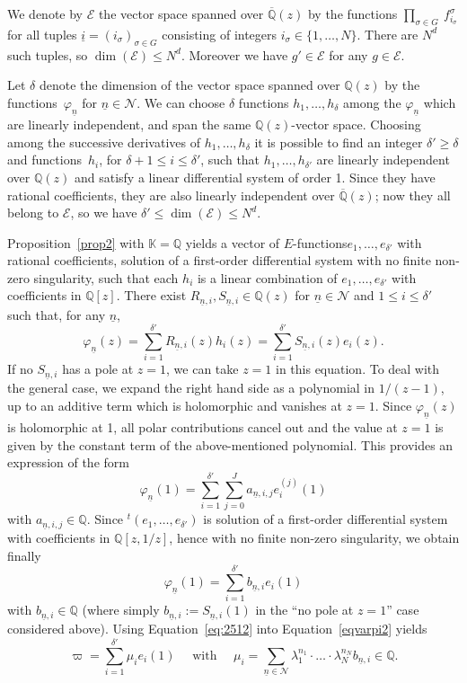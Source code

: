 \documentclass[11pt]{article}
\numberwithin{equation}{section}
\newcommand{\Efunctions}{$E$\nobreakdash-func\-tions\xspace}
\theoremstyle{definition}
\newcommand{\Q}{\mathbb{Q}}
\newcommand{\Qbar}{\overline{\mathbb Q}}
\newcommand{\calE}{\mathcal E}
\newcommand{\calN}{\mathcal N}
\newcommand{\isoul}{{\underline{i}}}
\newcommand{\nsoul}{\underline{n}}
\begin{document}
We denote by $\calE$ the vector space spanned over $\Qbar(z)$ by the functions
$\prod_{\sigma\in G} \ f_{i_{ \sigma}}^{ \sigma} $ for all tuples $\isoul = (i_\sigma)_{\sigma\in G}$ consisting of integers $i_\sigma\in\{1,\ldots,N\}$. There are $N^d$ such tuples, so $\dim(\calE)\leq N^d$. Moreover we have $g'\in\calE $ for any $g\in\calE$.

Let $\delta$ denote the dimension of the vector space spanned over $\Q(z)$ by the functions~$\varphi_{\nsoul}$ for $\nsoul\in\calN$. We can choose $\delta$ functions $h_1, \ldots, h_\delta$ among the $\varphi_{\nsoul}$ which are linearly independent, and span the same $\Q(z)$-vector space. Choosing among the successive derivatives of $h_1, \ldots, h_\delta$ it is possible to find an integer $\delta'\geq \delta$ and functions~$h_i$, for $\delta+1\leq i \leq \delta'$, such that $h_1, \ldots, h_{\delta'}$ are linearly independent over $\Q(z)$ and satisfy a linear differential system of order 1. Since they have rational coefficients, they are also linearly independent over $\Qbar(z)$; now they all belong to $\calE$, so we have $\delta'\leq \dim(\calE)\leq N^d$.

Proposition~\ref{prop2} with $\mathbb K=\mathbb Q$ yields a vector of \Efunctions $e_1,\ldots,e_{\delta'}$ with rational coefficients, solution of a first-order differential system with no finite non-zero singularity, such that each $h_i$ is a linear combination of $e_1,\ldots,e_{\delta'}$ with coefficients in $\Q[z]$. There exist $R_{\nsoul,i}, S_{\nsoul,i}\in\Q(z)$ for $\nsoul\in\calN$ and $1\leq i \leq \delta'$ such that, for any $\nsoul$,
\[
\varphi_{\nsoul}(z) = \sum_{i=1}^{\delta'} R_{\nsoul,i}(z) h_i(z) = \sum_{i=1}^{\delta'} S_{\nsoul,i}(z) e_i(z).
\]
If no $ S_{\nsoul,i}$ has a pole at $z=1$, we can take $z=1$ in this equation. To deal with the general case, we expand the right hand side as a polynomial in $1/(z-1)$, up to an additive term which is holomorphic and vanishes at $z=1$. Since $ \varphi_{\nsoul}(z)$ is holomorphic at 1, all polar contributions cancel out and the value at $z=1$ is given by the constant term of the above-mentioned polynomial. This provides an expression of the form
\[
\varphi_{\nsoul}(1) = \sum_{i=1}^{\delta'} \sum_{j=0}^{J} a_{\nsoul,i,j} e_i^{(j)}(1)
\]
with $a_{\nsoul,i,j}\in \Q$. Since ${}^t(e_1,\ldots,e_{\delta'})$ is solution of a first-order differential system with coefficients in $\mathbb Q[z,1/z]$, hence with no finite non-zero singularity, we obtain finally
\begin{equation}\label{eq:2512}
\varphi_{\nsoul}(1) = \sum_{i=1}^{\delta'} b_{\nsoul,i} e_i (1)
\end{equation}
with $b_{\nsoul,i}\in \Q$ (where simply $b_{\nsoul,i}:=S_{\nsoul,i}(1)$ in the ``no pole at $z=1$'' case considered above).
Using Equation~\eqref{eq:2512} into Equation~\eqref{eqvarpi2} yields
\[
\varpi = \sum_{i=1}^{\delta'} \mu_i e_i(1)
\quad \mbox{ with }\quad
\mu_i = \sum_{\nsoul \in \calN} \lambda_1^{n_1} \cdot \ldots \cdot \lambda_N^{n_N} b_{\nsoul,i}\in\Q.
\]
\end{document}

